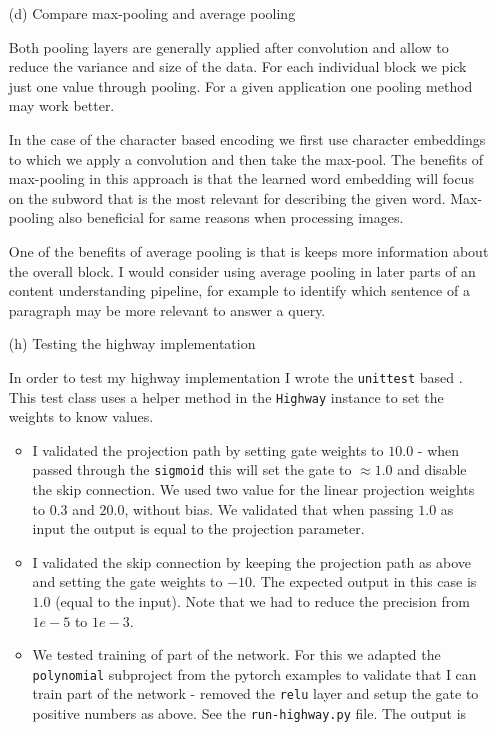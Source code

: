 \documentclass{article}
\begin{document}
\begin{enumerate}
\item[(d)]{Compare max-pooling and average pooling}

Both pooling layers are generally applied after convolution and allow to reduce the variance and size of the data. For each individual block we pick just one value through pooling. For a given application one pooling method may work better.

In the case of the character based encoding we first use character embeddings to which we apply a convolution and then take the max-pool. The benefits of max-pooling in this approach is that the learned word embedding will focus on the subword that is the most relevant for describing the given word. Max-pooling also beneficial for same reasons when processing images.

One of the benefits of average pooling is that is keeps more information about the overall block. I would consider using average pooling in later parts of an content understanding pipeline, for example to identify which sentence of a paragraph may be more relevant to answer a query.



\clearpage
\item[(h)]{Testing the highway implementation}

In order to test my highway implementation I wrote the \texttt{unittest} based . This test class uses a helper method in the \texttt{Highway} instance to set the weights to know values.

\begin{itemize}
\item I validated the projection path by setting gate weights to $10.0$ - when passed through the \texttt{sigmoid} this will set the gate to $\approx 1.0$ and disable the skip connection. We used two value for the linear projection weights to $0.3$ and $20.0$, without bias. We validated that when passing $1.0$ as input the output is equal to the projection parameter.
\item I validated the skip connection by keeping the projection path as above and setting the gate weights to $-10$. The expected output in this case is $1.0$ (equal to the input). Note that we had to reduce the precision from $1e-5$ to $1e-3$.
\item We tested training of part of the network. For this we adapted the \texttt{polynomial} subproject from the pytorch examples to validate that I can train part of the network - removed the \texttt{relu} layer and setup the gate to positive numbers as above. See the \texttt{run-highway.py} file. The output is


\end{itemize}
\end{enumerate}
\end{document}

